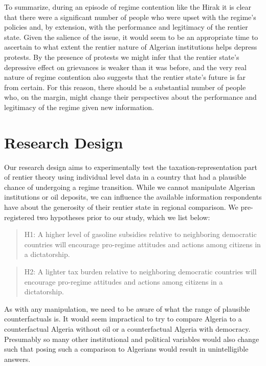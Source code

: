 \documentclass[12pt, letterpaper]{article}
\begin{document}
To summarize, during an episode of regime contention like the Hirak it is clear that there were a significant number of people who were upset with the regime's policies and, by extension, with the performance and legitimacy of the rentier state. Given the salience of the issue, it would seem to be an appropriate time to ascertain to what extent the rentier nature of Algerian institutions helps depress protests. By the presence of protests we might infer that the rentier state's depressive effect on grievances is weaker than it was before, and the very real nature of regime contention also suggests that the rentier state's future is far from certain. For this reason, there should be a substantial number of people who, on the margin, might change their perspectives about the performance and legitimacy of the regime given new information.

\section*{Research Design}

Our research design aims to experimentally test the taxation-representation part of rentier theory using individual level data in a country that had a plausible chance of undergoing a regime transition. While we cannot manipulate Algerian institutions or oil deposits, we can influence the available information respondents have about the generosity of their rentier state in regional comparison. We pre-registered two hypotheses prior to our study, which we list below:

\begin{quotation}
H1: A higher level of gasoline subsidies relative to neighboring democratic countries will encourage pro-regime attitudes and actions among citizens in a dictatorship.
\end{quotation}

\begin{quotation}
H2: A lighter tax burden relative to neighboring democratic countries will encourage pro-regime attitudes and actions among citizens in a dictatorship.
\end{quotation}

As with any manipulation, we need to be aware of what the range of plausible counterfactuals is. It would seem impractical to try to compare Algeria to a counterfactual Algeria without oil or a counterfactual Algeria with democracy. Presumably so many other institutional and political variables would also change such that posing such a comparison to Algerians would result in unintelligible answers.
\end{document}
